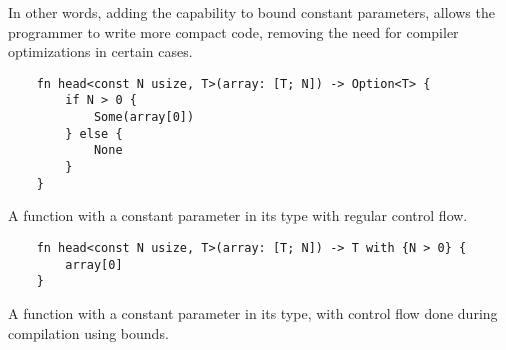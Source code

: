 In other words, adding the capability to bound constant parameters, allows the programmer to write more compact code, removing the need for compiler optimizations in certain cases.

\begin{listing}
    \begin{verbatim}
    fn head<const N usize, T>(array: [T; N]) -> Option<T> {
        if N > 0 {
            Some(array[0])
        } else {
            None
        }
    }
    \end{verbatim}
    \caption{A function with a constant parameter in its type with regular control flow.}
    \label{lst:const_no_bounds}
\end{listing}

\begin{listing}
    \begin{verbatim}
    fn head<const N usize, T>(array: [T; N]) -> T with {N > 0} {
        array[0]
    }
    \end{verbatim}
    \caption{A function with a constant parameter in its type, with control flow done during compilation using bounds.}
    \label{lst:const_bounds}
\end{listing}
